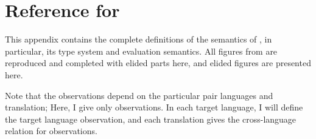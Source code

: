 \renewcommand{\techprefix}{srcapp}

\chapter{Reference for \slang}
\label{sec:source:appendix}
This appendix contains the complete definitions of the semantics of \slang, in
particular, its type system and evaluation semantics.
All \slang figures from  are reproduced and completed with
elided parts here, and elided figures are presented here.

Note that the observations depend on the particular pair languages and translation;
Here, I give only \slang observations.
In each target language, I will define the target language observation, and each
translation gives the cross-language relation for observations.
\begingroup
\let\label\discard

\FigECCSyntax[ht]
\FigECCRed[ht]

\endgroup

\FigECCConvFull[ht]

\begingroup
\let\label\discard

\FigECCEqv[ht]
\FigECCSub[ht]

\endgroup

\FigECCTyping[ht]

\begingroup
\let\label\discard

\FigECCObs[ht]
\FigECCProg[ht]
\FigECCEval[ht]
\FigLinking[ht]

\endgroup
